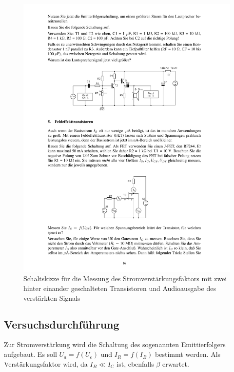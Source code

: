 \documentclass[12pt,a4paper]{article}
\begin{document}
\begin{figure}[H] 
  \centering
    \includegraphics[trim = 10mm 165mm 10mm 69mm, clip, scale = 1]{ep3_14[Page16].pdf}
  	\caption[Schaltskizze für die Messung des Stromverstärkungsfaktors mit zwei hinter einander geschalteten Transistoren und Audioausgabe des verstärkten Signals]{Schaltskizze für die Messung des Stromverstärkungsfaktors mit zwei hinter einander geschalteten Transistoren und Audioausgabe des verstärkten Signals\footnotemark}
  \label{fig:6}
\end{figure}

\subsection{Versuchsdurchführung}
Zur Stromverstärkung wird die Schaltung des sogenannten Emittierfolgers aufgebaut. Es soll $U_a = f(U_e)$ und $I_R = f(I_B)$ bestimmt werden. Als Verstärkungsfaktor wird, da $I_B \ll I_C$ ist, ebenfalls $\beta$ erwartet.
\end{document}
